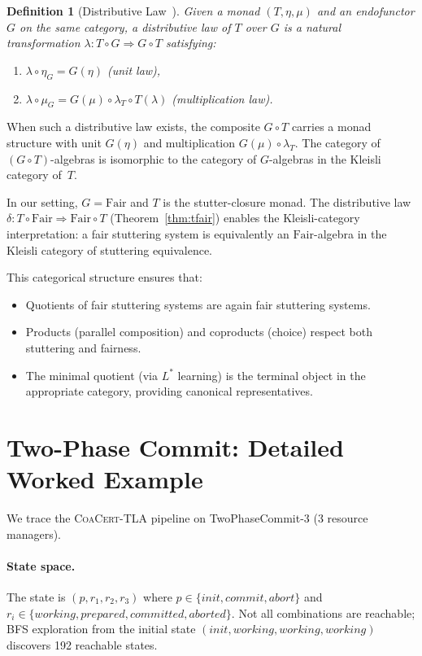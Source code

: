 \documentclass[11pt]{article}
\newtheorem{definition}[theorem]{Definition}
\newcommand{\Fair}{\ensuremath{\mathrm{Fair}}}
\newcommand{\CoaCert}{\textsc{CoaCert-TLA}}
\begin{document}
\begin{definition}[Distributive Law~\cite{Beck69}]
Given a monad $(T, \eta, \mu)$ and an endofunctor $G$ on the same
category, a \emph{distributive law} of $T$ over $G$ is a natural
transformation $\lambda : T \circ G \Rightarrow G \circ T$ satisfying:
\begin{enumerate}[nosep]
\item $\lambda \circ \eta_G = G(\eta)$ (unit law),
\item $\lambda \circ \mu_G = G(\mu) \circ \lambda_T \circ T(\lambda)$
  (multiplication law).
\end{enumerate}
\end{definition}

When such a distributive law exists, the composite $G \circ T$ carries
a monad structure with unit $G(\eta)$ and multiplication
$G(\mu) \circ \lambda_T$.
The category of $(G \circ T)$-algebras is isomorphic to the category
of $G$-algebras in the Kleisli category of~$T$.

In our setting, $G = \Fair$ and $T$ is the stutter-closure monad.
The distributive law $\delta : T \circ \Fair \Rightarrow \Fair \circ T$
(Theorem~\ref{thm:tfair}) enables the Kleisli-category interpretation:
a fair stuttering system is equivalently an $\Fair$-algebra in the
Kleisli category of stuttering equivalence.

This categorical structure ensures that:
\begin{itemize}[nosep]
\item Quotients of fair stuttering systems are again fair stuttering
  systems.
\item Products (parallel composition) and coproducts (choice) respect
  both stuttering and fairness.
\item The minimal quotient (via $L^*$ learning) is the terminal object
  in the appropriate category, providing canonical representatives.
\end{itemize}


\section{Two-Phase Commit: Detailed Worked Example}
\label{app:2pc-example}

We trace the \CoaCert{} pipeline on TwoPhaseCommit-3 (3 resource managers).

\paragraph{State space.}
The state is $(p, r_1, r_2, r_3)$ where
$p \in \{\mathit{init}, \mathit{commit}, \mathit{abort}\}$ and
$r_i \in \{\mathit{working}, \mathit{prepared}, \mathit{committed},
\mathit{aborted}\}$.
Not all combinations are reachable; BFS exploration from the initial state
$(init, working, working, working)$ discovers 192 reachable states.
\end{document}
